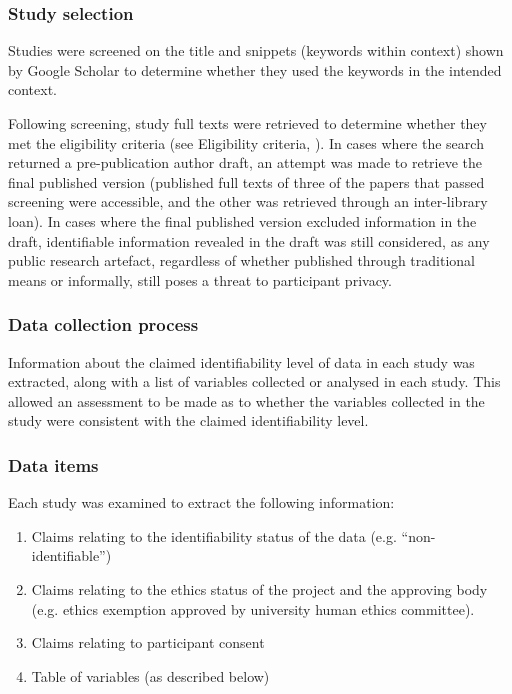 
\subsubsection{Study selection}

Studies were screened on the title and snippets (keywords within context) shown by Google Scholar to determine whether they used the keywords in the intended context.

Following screening, study full texts were retrieved to determine whether they met the eligibility criteria (see Eligibility criteria, ). In cases where the search returned a pre-publication author draft, an attempt was made to retrieve the final published version (published full texts of three of the papers that passed screening were accessible, and the other was retrieved through an inter-library loan). In cases where the final published version excluded information in the draft, identifiable information revealed in the draft was still considered, as any public research artefact, regardless of whether published through traditional means or informally, still poses a threat to participant privacy.

\subsubsection{Data collection process}

Information about the claimed identifiability level of data in each study was extracted, along with a list of variables collected or analysed in each study. This allowed an assessment to be made as to whether the variables collected in the study were consistent with the claimed identifiability level.

\subsubsection{Data items}
\label{sec:data-items}

Each study was examined to extract the following information:

\begin{enumerate}
\item Claims relating to the identifiability status of the data  (e.g. ``non-identifiable'')
\item Claims relating to the ethics status of the project and the approving body (e.g. ethics exemption approved by university human ethics committee).
\item Claims relating to participant consent
\item Table of variables (as described below)
\end{enumerate}


